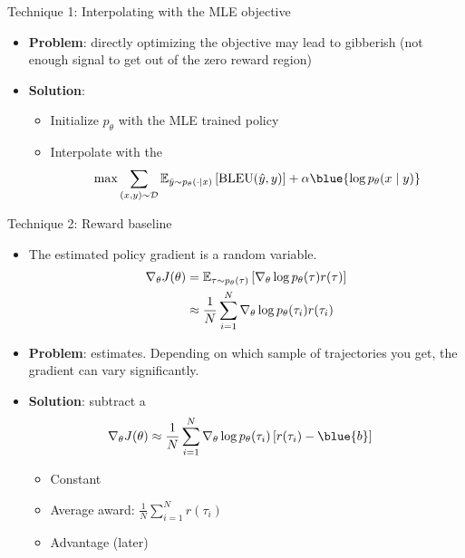 \documentclass[usenames,dvipsnames,notes,11pt,aspectratio=169,hyperref={colorlinks=true, linkcolor=blue}]{beamer}
\begin{document}
\begin{frame}
    {Technique 1: Interpolating with the MLE objective}
    \begin{itemize}
        \itemsep1em
        \item {\bf Problem}: directly optimizing the objective may lead to gibberish (not enough signal to get out of the zero reward region)
            \pause
        \item {\bf Solution}:
            \begin{itemize}
                \item Initialize $p_\theta$ with the MLE trained policy
                \item Interpolate with the 
                    $$
                    \max \sum_{(x,y)\sim \sD}\BE_{\hat{y}\sim p_\theta(\cdot\mid x)}\pb{\text{BLEU}(\hat{y},y)}
                    + \alpha \blue{\log p_\theta(x\mid y)}
                    $$
            \end{itemize}
    \end{itemize}
\end{frame}

\begin{frame}
    {Technique 2: Reward baseline}
    \begin{itemize}
        \item The estimated policy gradient is a random variable.
            \begin{align*}
                \nabla_\theta J(\theta) &= \mathbb{E}_{\tau\sim p_\theta(\tau)}\left[ \nabla_\theta \log p_\theta(\tau) r(\tau) \right]\\
                &\approx \frac{1}{N}\sum_{i=1}^N \nabla_\theta \log p_\theta(\tau_i) r(\tau_i) 
            \end{align*}
        \item {\bf Problem}:  estimates. Depending on which sample of trajectories you get, the gradient can vary significantly.
            \pause
        \item {\bf Solution}: subtract a 
            \vspace{-1em}
            \begin{align*}
                \nabla_\theta J(\theta) 
                &\approx \frac{1}{N}\sum_{i=1}^N \nabla_\theta \log p_\theta(\tau_i) \pb{r(\tau_i) - \blue{b}}
            \end{align*}
            \vspace{-1em}
            \begin{itemize}
                \item Constant
                \item Average award: $\frac{1}{N}\sum_{i=1}^N r(\tau_i)$ 
                \item Advantage (later) 
            \end{itemize}
    \end{itemize}
\end{frame}
\end{document}
